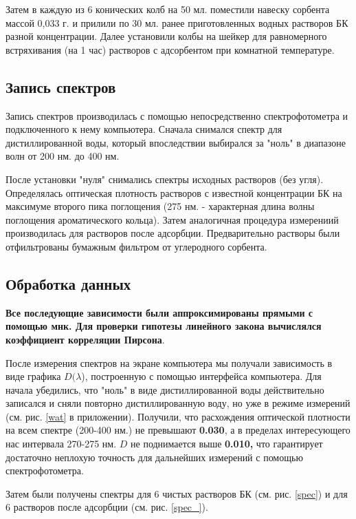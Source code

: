 \documentclass[a4paper,12pt]{article} %
\begin{document}
\par
Затем в каждую из 6 конических колб на 50 мл. поместили навеску сорбента массой 0,033 г. и прилили по 30 мл. ранее приготовленных водных растворов БК разной концентрации.
Далее установили колбы на шейкер для равномерного встряхивания (на 1 час) растворов с адсорбентом при комнатной температуре. 

\subsection*{Запись спектров}
Запись спектров производилась с помощью непосредственно спектрофотометра и подключенного к нему компьютера. Сначала снимался спектр для дистиллированной воды, который впоследствии выбирался за "ноль" в диапазоне волн от 200 нм. до 400 нм.
\par
После установки "нуля" снимались спектры исходных растворов (без угля). Определялась оптическая плотность растворов с известной концентрации БК на максимуме второго пика поглощения (275 нм. - характерная длина волны поглощения ароматического кольца).
Затем аналогичная процедура измерениий производилась для растворов после адсорбции. Предварительно растворы были отфильтрованы бумажным фильтром от углеродного сорбента.





\subsection*{Обработка данных}
\textbf{Все последующие зависимости были аппроксимированы прямыми с помощью мнк. Для проверки гипотезы линейного закона вычислялся коэффициент корреляции Пирсона}.
\par
После измерения спектров на экране компьютера мы получали зависимость в виде графика $D(\lambda$), построенную с помощью интерфейса компьютера. Для начала убедились, что "ноль" в виде дистиллированной воды действительно записался и сняли повторно дистиллированную воду, но уже в режиме измерений (см. рис. \ref{wat} в приложении). Получили, что расхождения оптической плотности на всем спектре (200-400 нм.) не превышают \textbf{0.030}, а в пределах интересующего нас интервала 270-275 нм. $D$ не поднимается выше \textbf{0.010,} что гарантирует достаточно неплохую точность для дальнейших измерений с помощью спектрофотометра.
\par
Затем были получены спектры для 6 чистых растворов БК (см. рис. \ref{spec}) и для 6 растворов после адсорбции (см. рис. \ref{spec_}).
\end{document}
